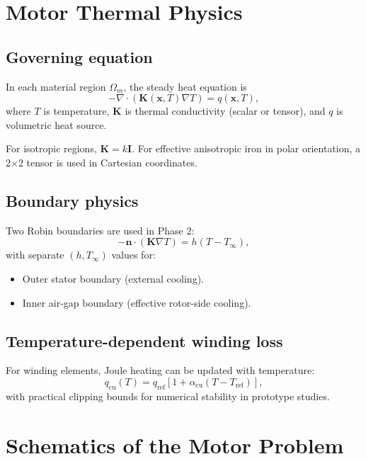 \documentclass[11pt,a4paper]{article}
\begin{document}
\section{Motor Thermal Physics}
\subsection{Governing equation}
In each material region \(\Omega_m\), the steady heat equation is
\begin{equation}
-\nabla \cdot \left( \mathbf{K}(\mathbf{x},T)\nabla T \right) = q(\mathbf{x},T),
\end{equation}
where \(T\) is temperature, \(\mathbf{K}\) is thermal conductivity (scalar or tensor), and \(q\) is volumetric heat source.

For isotropic regions, \(\mathbf{K}=k\mathbf{I}\). For effective anisotropic iron in polar orientation, a 2\(\times\)2 tensor is used in Cartesian coordinates.

\subsection{Boundary physics}
Two Robin boundaries are used in Phase 2:
\begin{equation}
-\mathbf{n}\cdot(\mathbf{K}\nabla T)=h\left(T-T_{\infty}\right),
\end{equation}
with separate \((h,T_{\infty})\) values for:
\begin{itemize}
    \item Outer stator boundary (external cooling).
    \item Inner air-gap boundary (effective rotor-side cooling).
\end{itemize}

\subsection{Temperature-dependent winding loss}
For winding elements, Joule heating can be updated with temperature:
\begin{equation}
q_{\text{cu}}(T)=q_{\text{ref}}\left[1+\alpha_{\text{cu}}(T-T_{\text{ref}})\right],
\end{equation}
with practical clipping bounds for numerical stability in prototype studies.

\section{Schematics of the Motor Problem}
\end{document}
